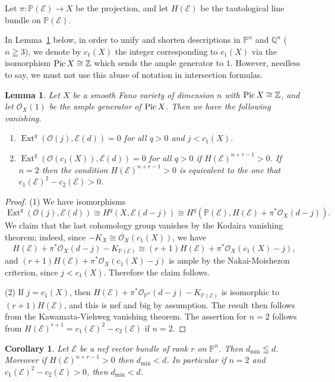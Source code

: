 \documentclass[a4paper,12pt]{amsart}
\newtheorem{lemma}[thm]{Lemma}%
\newtheorem{cor}[thm]{Corollary}%
\newcommand{\Pic}{\mathop{\rm Pic}\nolimits}
\DeclareMathOperator{\Ext}{Ext}
\begin{document}
Let $\pi:\mathbb{P}(\mathcal{E})\to X$ be the projection, and let $H(\mathcal{E})$ be the tautological line bundle
on $\mathbb{P}(\mathcal{E})$.

In Lemma~\ref{KodairaOnProjectiveSpace} below,
in order to unify and shorten descriptions in $\mathbb{P}^n$ and $\mathbb{Q}^n$ ($n\geqq 3$),
we 
denote by $c_1(X)$ the integer corresponding to $c_1(X)$
via the isomorphism $\Pic X\cong \mathbb{Z}$ which sends the ample generator to $1$.
However, needless to say, we must not use this abuse of notation in intersection formulas.


\begin{lemma}\label{KodairaOnProjectiveSpace}
Let $X$ be a smooth Fano variety of dimension $n$ with $\Pic X\cong \mathbb{Z}$,
and let $\mathcal{O}_X(1)$ be the ample generator of $\Pic X$.
Then we have the following vanishing.
\begin{enumerate}
\item[(1)] $\Ext^q(\mathcal{O}(j), \mathcal{E}(d))=0$ for all $q>0$ and $j< c_1(X)$.
\item[(2)] $\Ext^q(\mathcal{O}(c_1(X)), \mathcal{E}(d))=0$ for all $q>0$ if $H(\mathcal{E})^{n+r-1}>0$.
If $n=2$ then the condition $H(\mathcal{E})^{n+r-1}>0$ is equivalent to the one that $c_1(\mathcal{E})^2-c_2(\mathcal{E})>0$.
\end{enumerate}
\end{lemma}
\begin{proof}
(1)  We have isomorphisms 
\[\Ext^q(\mathcal{O}(j),\mathcal{E}(d))
\cong H^q(X,\mathcal{E}(d-j))
\cong H^q(\mathbb{P}(\mathcal{E}), H(\mathcal{E})+\pi^*\mathcal{O}_{X}(d-j)).\]
We claim that the last cohomology group vanishes by the Kodaira vanishing theorem;
indeed,
since $-K_X\cong \mathcal{O}_X(c_1(X))$,
we have 
\[H(\mathcal{E})+\pi^*\mathcal{O}_{X}(d-j)-K_{\mathbb{P}(\mathcal{E})}
\cong (r+1)H(\mathcal{E})+\pi^*\mathcal{O}_{X}(c_1(X)-j),\]
and $(r+1)H(\mathcal{E})+\pi^*\mathcal{O}_{X}(c_1(X)-j)$ is ample by the Nakai-Moishezon criterion, since $j<c_1(X)$.
Therefore the claim follows.

(2) If $j=c_1(X)$, then 
$H(\mathcal{E})+\pi^*\mathcal{O}_{\mathbb{P}^n}(d-j)-K_{\mathbb{P}(\mathcal{E})}$ 
is isomorphic to $(r+1)H(\mathcal{E})$, and this is nef and big by assumption.
The result then follows from the Kawamata-Viehweg vanishing theorem.
The assertion for $n=2$ follows from  $H(\mathcal{E})^{r+1}=c_1(\mathcal{E})^2-c_2(\mathcal{E})$ if $n=2$.
\end{proof}


\begin{cor}\label{ProSpaceResol}
Let $\mathcal{E}$ be a nef vector bundle of rank $r$ on $\mathbb{P}^n$.
Then $d_{\min}\leqq d$.
Moreover if $H(\mathcal{E})^{n+r-1}>0$ then $d_{\min}< d$.
In particular if $n=2$ and $c_1(\mathcal{E})^2-c_2(\mathcal{E})>0$,
then $d_{\min}< d$.
\end{cor}
\end{document}
